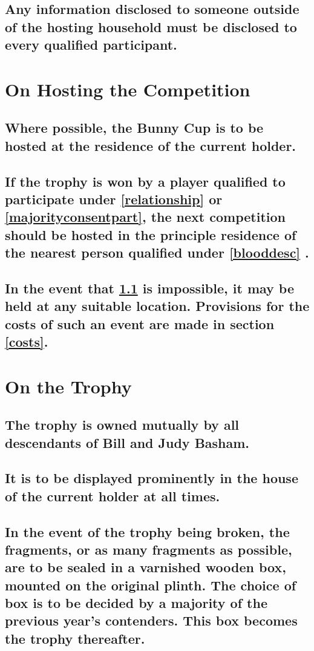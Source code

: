 \documentclass[a4paper]{article}
\begin{document}
\subsection{Any information disclosed to someone outside of the hosting household must be disclosed to every qualified participant.}



\section{On Hosting the Competition}
\subsection{Where possible, the Bunny Cup is to be hosted at the residence of the current holder.}\label{currentholder}
\subsection{If the trophy is won by a player qualified to participate under \ref{relationship} or \ref{majorityconsentpart}, the next competition should be hosted in the principle residence of the nearest person qualified under \ref{blooddesc} .}
\subsection{In the event that \ref{currentholder} is impossible,  it may be held at any suitable location. Provisions for the costs of such an event are made in section  \ref{costs}.}

\newpage

\section{On the Trophy}
\subsection{The trophy is owned mutually by all descendants of Bill and Judy Basham.}\label{trophownership}
\subsection{It is to be displayed prominently in the house of the current holder at all times.}\label{promdisplay}
\subsection{In the event of the trophy being broken, the fragments, or as many fragments as possible, are to be sealed in a varnished wooden box, mounted on the original plinth. The choice of box is to be decided by a majority of the previous year’s contenders. This box becomes the trophy thereafter.}
\end{document}
